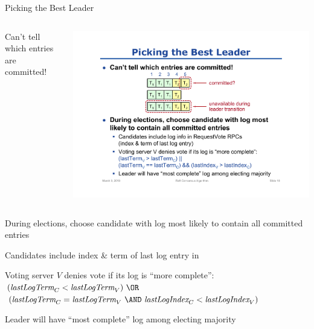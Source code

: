 \begin{frame}{Picking the Best Leader}
	
\begin{columns}[T]
\begin{column}{0.38\textwidth}
\BIL
\item Can't tell which entries are committed!
\EIL
\end{column}
\begin{column}{0.6\textwidth}
\includegraphics[width=\textwidth]{iscommitted}
\end{column}
\end{columns}
\BIL
\item During elections, choose candidate with log most likely to contain all committed entries
\smallskip
\BIL
\item Candidates include index \& term of last log entry in \VOTEREQUEST
\item Voting server $V$ \alert{denies} vote if its log is “more complete”:
{\footnotesize $(\lastTerm_C < \lastTerm_V)\ \OR\ $\\
$(\lastTerm_C = \lastTerm_V \ \AND\ \lastIndex_C < \lastIndex_V)$}
\item Leader will have “most complete” log among electing majority
\EI
\EIL

\end{frame}

